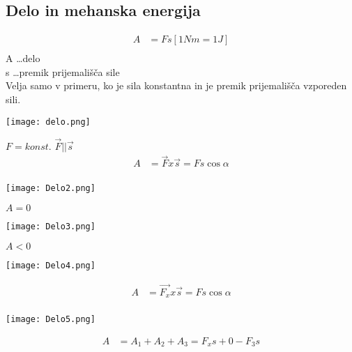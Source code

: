 {\color{indiagreen}\subsection{Delo in mehanska energija}}
\begin{align*}
	A &= Fs [1Nm = 1J]\\
\end{align*}
A \dots delo\\
s \dots premik prijemališča sile\\
Velja samo v primeru, ko je sila konstantna in je premik prijemališča vzporeden sili.\\
\begin{center}
	\texttt{[image: delo.png]}
\end{center}
$F = konst.$ \hspace{1cm} $\vec{F} || \vec{s}$\\
\begin{align*}
	A &= \vec{F} x \vec{s} = Fs\cos\alpha\\
\end{align*}
\begin{center}
	\texttt{[image: Delo2.png]}
\end{center}
$A = 0$\\
\begin{center}
	\texttt{[image: Delo3.png]}
\end{center}
$A < 0$\\
\begin{center}
	\texttt{[image: Delo4.png]}
\end{center}
\begin{align*}
	A &= \vec{F_x} x \vec{s} = Fs\cos\alpha\\
\end{align*}
\begin{center}
	\texttt{[image: Delo5.png]}
\end{center}
\begin{align*}
	A &= A_1 + A_2 + A_3 = F_xs + 0 - F_3s\\
\end{align*}
